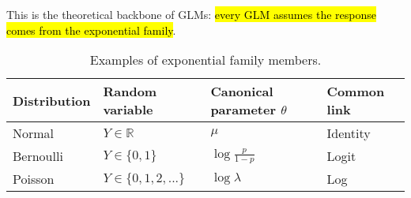 \highspace
This is the theoretical backbone of GLMs: \hl{every GLM assumes the response comes from the exponential family}.

\begin{table}[!htp]
    \centering
    \begin{tabular}{@{} l l l l @{}}
        \toprule
        Distribution & Random variable & Canonical parameter $\theta$ & Common link \\
        \midrule
        Normal      & $Y \in \mathbb{R}$    & $\mu$                 & Identity  \\ [.3em]
        Bernoulli   & $Y \in \{0,1\}$       & $\log \frac{p}{1-p}$  & Logit     \\ [.3em]
        Poisson     & $Y \in \{0,1,2,...\}$ & $\log \lambda$        & Log       \\
        \bottomrule
    \end{tabular}
    \caption{Examples of exponential family members.}
\end{table}